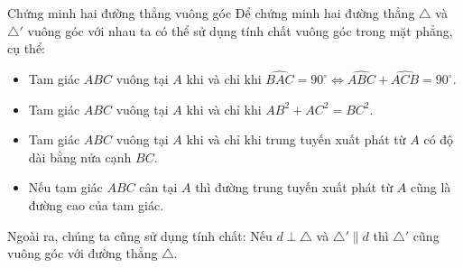 \begin{dang}{Chứng minh hai đường thẳng vuông góc}
	Để chứng minh hai đường thẳng $\triangle$ và $\triangle'$ vuông góc với nhau ta có thể sử dụng tính chất vuông góc trong mặt phẳng, cụ thể:
	\begin{itemize}
		\item Tam giác $ABC$ vuông tại $A$ khi và chỉ khi $\widehat{BAC}=90^{\circ} \Leftrightarrow \widehat{ABC}+\widehat{ACB}=90^{\circ}.$
		\item Tam giác $ABC$ vuông tại $A$ khi và chỉ khi $AB^2+AC^2=BC^2.$
		\item Tam giác $ABC$ vuông tại $A$ khi và chỉ khi trung tuyến xuất phát từ $A$ có độ dài bằng nửa cạnh $BC$.
		\item Nếu tam giác $ABC$ cân tại $A$ thì đường trung tuyến xuất phát từ $A$ cũng là đường cao của tam giác.
	\end{itemize}
	Ngoài ra, chúng ta cũng sử dụng tính chất: Nếu $d\perp \triangle$ và $\triangle'\parallel d$ thì $\triangle'$ cũng vuông góc với đường thẳng $\triangle.$
\end{dang}